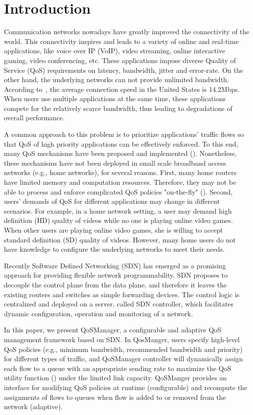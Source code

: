 \section{Introduction}
\label{sect:intro}

Communication networks nowadays have greatly improved the connectivity of the world. This connectivity
inspires and leads to a variety of online and real-time applications, like voice over IP (VoIP), video
streaming, online interactive gaming, video conferencing, etc. These applications impose diverse Quality
of Service (QoS) requirements on latency, bandwidth, jitter and error-rate. On the other hand, the
underlying networks can not provide unlimited bandwidth. According to~\cite{akamai}, the average
connection speed in the United States is 14.2Mbps. When users use multiple applications at the same time,
these applications compete for the relatively scarce bandwidth, thus leading to degradations of overall
performance.

A common approach to this problem is to prioritize applications' traffic flows so that QoS of high
priority applications can be effectively enforced. To this end, many QoS mechanisms have been proposed and
implemented (). Nonetheless, these mechanisms have not been deployed in small scale broadband
access networks (e.g., home networks), for several reasons. First, many home routers have limited memory and
computation resources. Therefore, they may not be able to process and enforce complicated QoS policies
"on-the-fly" (). Second, users' demands of QoS for different applications may change in different
scenarios. For example, in a home network setting, a user may demand high definition (HD) quality of videos while
no one is playing online video games. When other users are playing online video games, she is willing to accept
standard definition (SD) quality of videos. However, many home users do not have knowledge to configure the
underlying networks to meet their needs.

Recently Software Defined Networking (SDN) has emerged as a promising approach for providing flexible network
programmability. SDN proposes to decouple the control plane from the data plane, and therefore it leaves the
existing routers and switches as simple forwarding devices. The control logic is centralized and deployed on a
server, called SDN controller, which facilitates dynamic configuration, operation and monitoring of a network.

In this paper, we present QoSManager, a configurable and adaptive QoS management framework based on SDN. In
QosManger, users specify high-level QoS policies (e.g., minimum bandwidth, recommended bandwidth and priority)
for different types of traffic, and QoSManager controller will dynamically assign each flow to a queue with an
appropriate sending rate to maximize the QoS utility function () under the limited link capacity.
QoSManger provides an interface for modifying QoS policies at runtime (configurable) and recompute the assignments
of flows to queues when flow is added to or removed from the network (adaptive).

